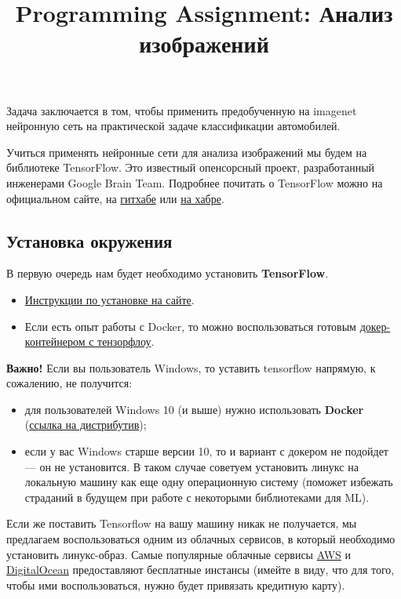 \documentclass[11pt,a4paper]{article}
\title{Programming Assignment: Анализ изображений}
\begin{document}
\maketitle

Задача заключается в том, чтобы применить предобученную на imagenet нейронную сеть на практической задаче классификации автомобилей.

Учиться применять нейронные сети для анализа изображений мы будем на библиотеке TensorFlow. Это известный опенсорсный проект, разработанный инженерами Google Brain Team. Подробнее почитать о TensorFlow можно на официальном сайте, на \href{https://github.com/tensorflow/tensorflow}{гитхабе} или \href{https://habrahabr.ru/post/270543/}{на хабре}.

\subsection{Установка окружения}

В первую очередь нам будет необходимо установить \textbf{TensorFlow}.

\begin{itemize}
\item \href{https://www.tensorflow.org/versions/r0.10/get\_started/os\_setup.html\#download-and-setup}{Инструкции по установке на сайте}.
\item Если есть опыт работы с Docker, то можно воспользоваться готовым \href{https://www.tensorflow.org/versions/r0.10/get\_started/os\_setup.html\#docker-installation}{докер-контейнером с тензорфлоу}.
\end{itemize}

\textbf{Важно!} Если вы пользователь Windows, то уставить tensorflow напрямую, к сожалению, не получится:

\begin{itemize}
\item для пользователей Windows 10 (и выше) нужно использовать \textbf{Docker} (\href{https://www.docker.com/products/docker\#/windows}{ссылка на дистрибутив});
\item если у вас Windows старше версии 10, то и вариант с докером не подойдет — он не установится. В таком случае советуем установить линукс на локальную машину как еще одну операционную систему (поможет избежать страданий в будущем при работе с некоторыми библиотеками для ML).
\end{itemize}

Если же поставить Tensorflow на вашу машину никак не получается, мы предлагаем воспользоваться одним из облачных сервисов, в который необходимо установить линукс-образ. Самые популярные облачные сервисы \href{https://aws.amazon.com/}{AWS} и \href{http://digitalocean.com/}{DigitalOcean} предоставляют бесплатные инстансы (имейте в виду, что для того, чтобы ими воспользоваться, нужно будет привязать кредитную карту).
\end{document}
